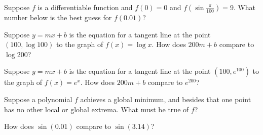 \documentclass{ximera}
\newcommand{\recommendation}[1]{}
\begin{document}
\begin{shuffle}
\begin{problem}
  Suppose $f$ is a differentiable function and $f(0) = 0$ and
  $f(\sin \frac{\pi}{100}) = 9$.  What number below is the best guess for $f(0.01)$?
  \begin{multipleChoice}
  \end{multipleChoice}
\end{problem}

\begin{problem}
  Suppose $y = mx + b$ is the equation for a tangent line at the point $(100,\log 100)$ to the graph of $f(x) = \log x$.  How does $200m + b$ compare to $\log 200$?
  \begin{multipleChoice}
  \end{multipleChoice}
\end{problem}

\begin{problem}
  Suppose $y = mx + b$ is the equation for a tangent line at the point $(100,e^{100})$ to the graph of $f(x) = e^x$.  How does $200m + b$ compare to $e^{200}$?
  \begin{multipleChoice}
  \end{multipleChoice}
\end{problem}

\begin{problem}
  Suppose a polynomial $f$ achieves a global minimum, and besides that
  one point has no other local or global extrema.  What must be true
  of $f$?
  \begin{multipleChoice}
  \end{multipleChoice}
\end{problem}

\begin{problem}
  How does $\sin(0.01)$ compare to $\sin(3.14)$?
  \begin{multipleChoice}
  \end{multipleChoice}
\end{problem}


\end{shuffle}
\end{document}
